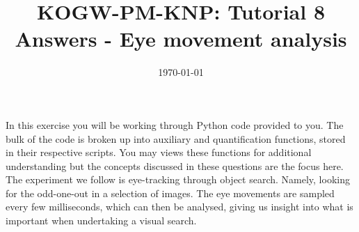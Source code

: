 \documentclass[12pt,english]{scrartcl}
\title{KOGW-PM-KNP: Tutorial 8 Answers - Eye movement analysis}
\author{}
\date{\today}
\begin{document}
\maketitle
In this exercise you will be working through Python code provided to you. The bulk of the code is broken up into auxiliary and quantification functions, stored in their respective scripts. You may views these functions for additional understanding but the concepts discussed in these questions are the focus here. \\

The experiment we follow is eye-tracking through object search. Namely, looking for the odd-one-out in a selection of images. The eye movements are sampled every few milliseconds, which can then be analysed, giving us insight into what is important when undertaking a visual search.
\end{document}
